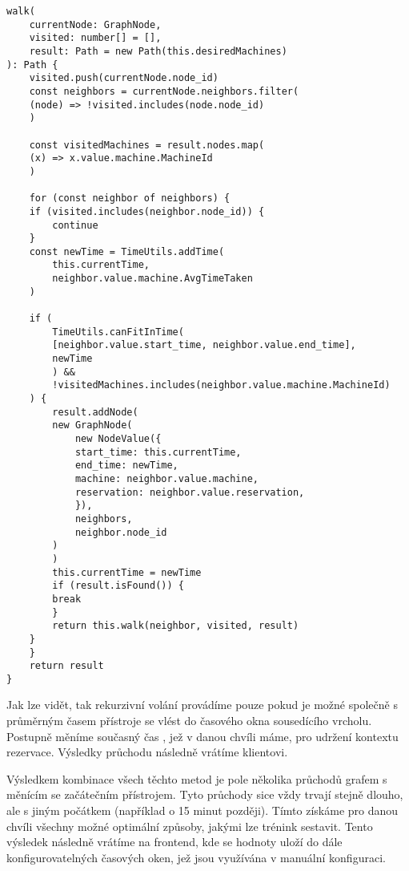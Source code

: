 \begin{lstlisting}
walk(
    currentNode: GraphNode,
    visited: number[] = [],
    result: Path = new Path(this.desiredMachines)
): Path {
    visited.push(currentNode.node_id)
    const neighbors = currentNode.neighbors.filter(
	(node) => !visited.includes(node.node_id)
    )

    const visitedMachines = result.nodes.map(
	(x) => x.value.machine.MachineId
    )

    for (const neighbor of neighbors) {
	if (visited.includes(neighbor.node_id)) {
	    continue
	}
	const newTime = TimeUtils.addTime(
	    this.currentTime,
	    neighbor.value.machine.AvgTimeTaken
	)

	if (
	    TimeUtils.canFitInTime(
		[neighbor.value.start_time, neighbor.value.end_time],
		newTime
	    ) &&
	    !visitedMachines.includes(neighbor.value.machine.MachineId)
	) {
	    result.addNode(
		new GraphNode(
		    new NodeValue({
			start_time: this.currentTime,
			end_time: newTime,
			machine: neighbor.value.machine,
			reservation: neighbor.value.reservation,
		    }),
		    neighbors,
		    neighbor.node_id
		)
	    )
	    this.currentTime = newTime
	    if (result.isFound()) {
		break
	    }
	    return this.walk(neighbor, visited, result)
	}
    }
    return result
}
\end{lstlisting}

Jak lze vidět, tak rekurzivní volání provádíme pouze pokud je možné společně s průměrným časem přístroje se vlést do časového okna sousedícího vrcholu. Postupně měníme současný čas , jež v danou chvíli máme, pro udržení kontextu rezervace. Výsledky průchodu následně vrátíme klientovi.

Výsledkem kombinace všech těchto metod je pole několika průchodů grafem s měnícím se začátečním přístrojem. Tyto průchody sice vždy trvají stejně dlouho, ale s jiným počátkem (například o 15 minut později). Tímto získáme pro danou chvíli všechny možné optimální způsoby, jakými lze trénink sestavit. Tento výsledek následně vrátíme na frontend, kde se hodnoty uloží do dále konfigurovatelných časových oken, jež jsou využívána v manuální konfiguraci.
